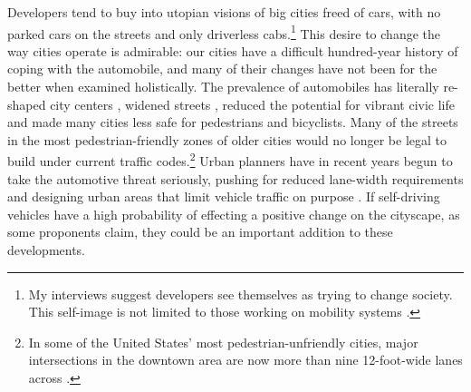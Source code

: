 


Developers tend to buy into utopian visions of big cities freed of cars, with no
parked cars on the streets and only driverless cabs.\footnote{My
  interviews suggest developers see
themselves as trying to change society. This self-image is not limited
to those working on mobility systems \cite{naughtonTech}.} This desire to
change the way cities operate is admirable: our cities have a
difficult hundred-year history of coping with the
automobile, and many of their changes have not been for the better
when examined holistically. The prevalence of automobiles has
literally re-shaped city centers \cite[p. 7]{burdenCities}, widened
streets \cite[p. 10]{burdenCities} \cite[p. 65]{fernandezBoulder},
reduced the potential for vibrant civic life \cite[p. 60]{miaraBoston}
and made many cities less safe for 
pedestrians and bicyclists. Many of the streets in the most
pedestrian-friendly zones of older cities would no longer be legal to
build under 
current traffic codes.\footnote{In some of the
United States' most pedestrian-unfriendly cities, major intersections
in the downtown area are now more than nine 12-foot-wide lanes across
\cite{citylab}.} Urban planners have
in recent years begun to take the automotive threat seriously, pushing
for reduced lane-width requirements and designing urban areas that
limit vehicle traffic on purpose \cite[p. 67]{fernandezBoulder}. If self-driving
vehicles have a high probability of effecting a positive change on the
cityscape, as some proponents claim, they could be an important
addition to these developments.

